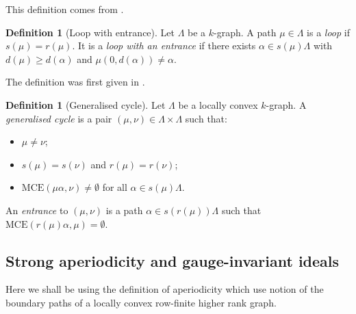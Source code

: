 \documentclass[12pt]{amsart}
\theoremstyle{plain}
\theoremstyle{definition}
\newtheorem{definition}[theorem]{Definition}
\theoremstyle{remark}
\begin{document}
\noindent
This definition comes from \cite[Definition 8.7]{S}.

\begin{definition}[Loop with entrance]\label{def:loop-entrance}
Let $\Lambda$ be a $k$-graph. A path $\mu\in\Lambda$ is a \emph{loop}
if $s(\mu)=r(\mu)$. It is a \emph{loop with an entrance} if there exists
$\alpha\in s(\mu)\Lambda$ with $d(\mu)\geq d(\alpha)$ and
$\mu(0,d(\alpha))\neq\alpha$.
\end{definition}

\noindent
The definition was first given in \cite[Definition 3.1]{ES}.

\begin{definition}[Generalised cycle]\label{def:gen-cycle}
Let $\Lambda$ be a locally convex $k$-graph. A \emph{generalised cycle}
is a pair $(\mu,\nu)\in\Lambda\times\Lambda$ such that:
\begin{itemize}
\item $\mu\neq\nu$;
\item $s(\mu)=s(\nu)$ and $r(\mu)=r(\nu)$;
\item $\mathrm{MCE}(\mu\alpha,\nu)\neq\emptyset$ for all
      $\alpha\in s(\mu)\Lambda$.
\end{itemize}
An \emph{entrance} to $(\mu,\nu)$ is a path $\alpha\in s(r(\mu))\Lambda$
such that $\mathrm{MCE}(r(\mu)\alpha,\mu)=\emptyset$.
\end{definition}

\subsection{Strong aperiodicity and gauge-invariant ideals}

Here we shall be using the definition of aperiodicity which use notion of the boundary paths of a locally convex row-finite higher rank graph.
\end{document}
